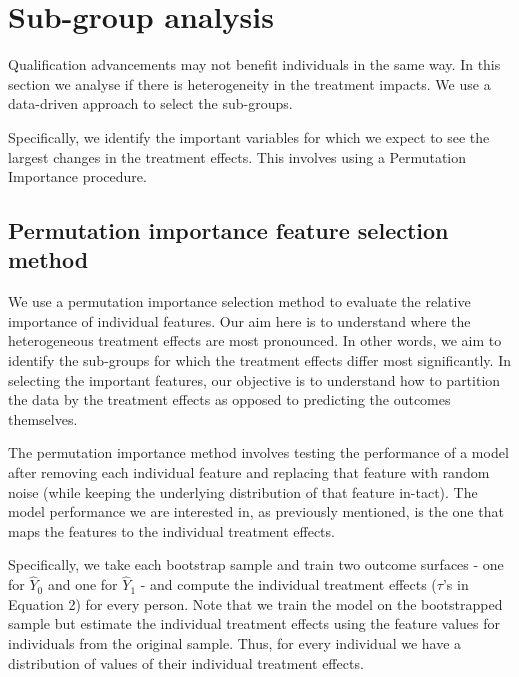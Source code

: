 \documentclass[12pt, a4paper]{article}
\begin{document}
\section{Sub-group analysis}

Qualification advancements may not benefit individuals in the same way. In this section we analyse if there is heterogeneity in the treatment impacts. We use a data-driven approach to select the sub-groups.  
%
%


Specifically, we identify the important variables for which we expect to see the largest changes in the treatment effects. This involves using a Permutation Importance procedure.




\subsection{Permutation importance feature selection method}

We use a permutation importance selection method to evaluate the relative importance of individual features. Our aim here is to understand where the heterogeneous treatment effects are most pronounced. In other words, we aim to identify the sub-groups for which the treatment effects differ most significantly. In selecting the important features, our objective is to understand how to partition the data by the treatment effects as opposed to predicting the outcomes themselves. 

The permutation importance method involves testing the performance of a model after removing each individual feature and replacing that feature with random noise (while keeping the underlying distribution of that feature in-tact). The model performance we are interested in, as previously mentioned, is the one that maps the features to the individual treatment effects. 

Specifically, we take each bootstrap sample and train two outcome surfaces - one for $\hat{Y}_0$ and one for $\hat{Y}_1$ - and compute the individual treatment effects ($\tau$'s in Equation 2) for every person. Note that we train the model on the bootstrapped sample but estimate the individual treatment effects using the feature values for individuals from the original sample. Thus, for every individual we have a distribution of values of their individual treatment effects. 
\end{document}

